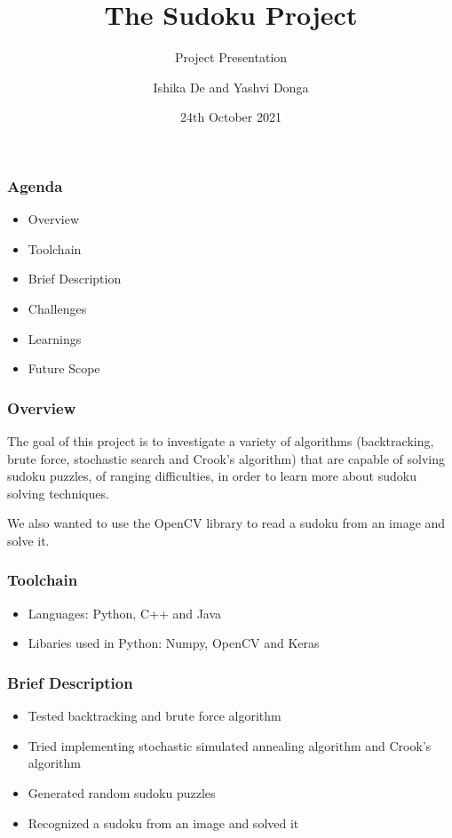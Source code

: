 \documentclass{beamer}
\title{The Sudoku Project}
\subtitle{Project Presentation}
\author[Ishika | Yashvi]{Ishika De and Yashvi Donga}
\date{24th October 2021}
\begin{document}
\begin{frame}
     \titlepage
\end{frame}
\begin{frame}
     \frametitle{Agenda}
     \begin{itemize}
          \item Overview
          \item Toolchain
          \item Brief Description
          \item Challenges
          \item Learnings
          \item Future Scope
     \end{itemize}
\end{frame}

\begin{frame}
     \frametitle{Overview}
     The goal of this project is to investigate a variety of algorithms (backtracking, brute force, stochastic search and Crook's algorithm) that are capable of solving sudoku puzzles, of ranging difficulties, in order to learn more about sudoku solving techniques.\newline

     We also wanted to use the OpenCV library to read a sudoku from an image and solve it.
\end{frame}

\begin{frame}
    \frametitle{Toolchain}
    \begin{itemize}
         \item Languages: Python, C++ and Java
         \item Libaries used in Python: Numpy, OpenCV and Keras
    \end{itemize}
\end{frame}

\begin{frame}
     \frametitle{Brief Description}   
     \begin{itemize}
		  \item Tested backtracking and brute force algorithm
		  \item Tried implementing stochastic simulated annealing algorithm and Crook's algorithm
		  \item Generated random sudoku puzzles
		  \item Recognized a sudoku from an image and solved it
	 \end{itemize}
\end{frame}
\end{document}
